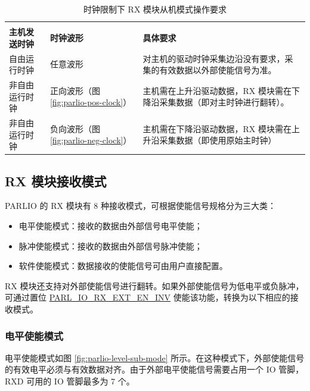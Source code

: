\documentclass[main\_\_CN.tex]{subfiles}
\begin{document}
\begin{table}[H]
    \centering
    \caption{时钟限制下 RX 模块从机模式操作要求}
    \label{tab:parlio-rx-slave-restriction}
    
    \begin{tabular}{|l|l|p{10cm}|}
    \hline
        \rowcolor{lightgray}
        \multicolumn{2}{|c|}{\textbf{时钟条件}} & \\
        \rowcolor{lightgray}
        \textbf{主机发送时钟} &\textbf{时钟波形} & \multirow{-2}{*}{\textbf{具体要求}} \\ \hline
        
        自由运行时钟    & 任意波形  & 对主机的驱动时钟采集边沿没有要求，采集的有效数据以外部使能信号为准。 \\ \hline
        非自由运行时钟  & 正向波形（图 \ref{fig:parlio-pos-clock}） & 主机需在上升沿驱动数据，RX 模块需在下降沿采集数据（即对主时钟进行翻转）。    \\ \hline
        非自由运行时钟  & 负向波形（图 \ref{fig:parlio-neg-clock}）  & 主机需在下降沿驱动数据，RX 模块需在上升沿采集数据（即使用原始主时钟）   \\ \hline
    \end{tabular}
\end{table}

\subsection{RX 模块接收模式}

PARLIO 的 RX 模块有 8 种接收模式，可根据使能信号规格分为三大类：

\begin{itemize}
    \item 电平使能模式：接收的数据由外部信号电平使能；
    \item 脉冲使能模式：接收的数据由外部信号脉冲使能；
    \item 软件使能模式：数据接收的使能信号可由用户直接配置。
\end{itemize}

RX 模块还支持对外部使能信号进行翻转。如果外部使能信号为低电平或负脉冲，可通过置位 \hyperref[fielddesc:PARLIORXEXTENINV]{PARL\_IO\_RX\_EXT\_EN\_INV} 使能该功能，转换为以下相应的接收模式。

\subsubsection{电平使能模式}

电平使能模式如图 \ref{fig:parlio-level-sub-mode} 所示。在这种模式下，外部使能信号的有效电平必须与有效数据对齐。由于外部电平使能信号需要占用一个 IO 管脚，RXD 可用的 IO 管脚最多为 7 个。
\end{document}
